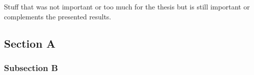 \documentclass[class=scrbook, crop=false]{standalone}
\begin{document}
\appendix

\chapter{}
\label{Chapter::Some Appendix}
Stuff that was not important or too much for the thesis but is still important or complements the presented results.

\section{Section A}
\label{Section::Some Appendix:Section A}

\subsection{Subsection B}
\label{Subsection::Some Appendix:Subsection B}

\Blindtext
\chapter{}

\blindtext
\Blindtext
\end{document}
